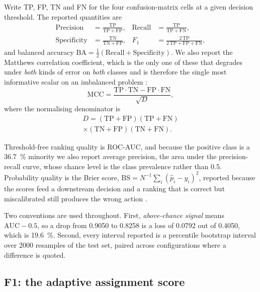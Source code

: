 Write TP, FP, TN and FN for the four confusion-matrix cells at a given decision threshold.
The reported quantities are
\begin{align}
\mathrm{Precision} &= \frac{\mathrm{TP}}{\mathrm{TP}+\mathrm{FP}},
&\mathrm{Recall} &= \frac{\mathrm{TP}}{\mathrm{TP}+\mathrm{FN}},
\label{eq:prec}\\[2pt]
\mathrm{Specificity} &= \frac{\mathrm{TN}}{\mathrm{TN}+\mathrm{FP}},
&F_1 &= \frac{2\,\mathrm{TP}}{2\,\mathrm{TP}+\mathrm{FP}+\mathrm{FN}},
\label{eq:f1}
\end{align}
and balanced accuracy
$\mathrm{BA} = \tfrac{1}{2}(\mathrm{Recall}+\mathrm{Specificity})$.
We also report the Matthews correlation coefficient, which is the only one of these that
degrades under \emph{both} kinds of error on \emph{both} classes and is therefore the
single most informative scalar on an imbalanced problem \citep{chicco2020advantages}:
\begin{equation}
\mathrm{MCC} = \frac{\mathrm{TP}\cdot\mathrm{TN} - \mathrm{FP}\cdot\mathrm{FN}}{\sqrt{D}},
\label{eq:mcc}
\end{equation}
where the normalising denominator is
\begin{multline}
D = (\mathrm{TP}+\mathrm{FP})(\mathrm{TP}+\mathrm{FN})\\
\times(\mathrm{TN}+\mathrm{FP})(\mathrm{TN}+\mathrm{FN}).
\label{eq:mccD}
\end{multline}

Threshold-free ranking quality is ROC-AUC, and because the positive class is a
\SI{36.7}{\percent} minority we also report average precision, the area under the
precision-recall curve, whose chance level is the class prevalence rather than \num{0.5}.
Probability quality is the Brier score,
$\mathrm{BS} = N^{-1}\sum_i (\hat{p}_i - y_i)^2$, reported because the scores feed a downstream
decision and a ranking that is correct but miscalibrated still produces the wrong action
\citep{filho2023classifier,perezlebel2025decision}.

Two conventions are used throughout. First, \emph{above-chance signal} means $\mathrm{AUC}-0.5$,
so a drop from \num{0.9050} to \num{0.8258} is a loss of \num{0.0792} out of \num{0.4050}, which
is \SI{19.6}{\percent}. Second, every interval reported is a percentile bootstrap interval over
2000 resamples of the test set, paired across configurations where a difference is quoted.

\subsection{F1: the adaptive assignment score}
\label{sec:f1}

